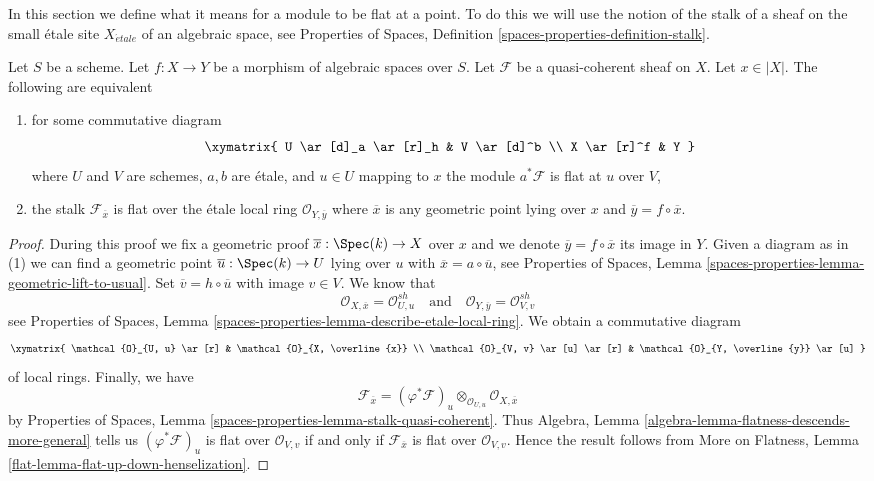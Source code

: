 \noindent
In this section we define what it means for a module to be flat at
a point. To do this we will use the notion of the stalk of a sheaf on
the small \'etale site $X_{\acute{e}tale}$ of an algebraic space, see
Properties of Spaces, Definition \ref{spaces-properties-definition-stalk}.

\begin{lemma}
\label{lemma-flat-at-point}
Let $S$ be a scheme. Let $f : X \to Y$ be a morphism of algebraic
spaces over $S$. Let $\mathcal{F}$ be a quasi-coherent sheaf on $X$.
Let $x \in |X|$. The following are equivalent
\begin{enumerate}
\item for some commutative diagram
$$
\xymatrix{
U \ar[d]_a \ar[r]_h & V \ar[d]^b \\
X \ar[r]^f & Y
}
$$
where $U$ and $V$ are schemes, $a, b$ are \'etale, and
$u \in U$ mapping to $x$ the module $a^*\mathcal{F}$ is flat at $u$ over $V$,
\item the stalk $\mathcal{F}_{\overline{x}}$ is flat over
the \'etale local ring $\mathcal{O}_{Y, \overline{y}}$
where $\overline{x}$ is any geometric point lying over
$x$ and $\overline{y} = f \circ \overline{x}$.
\end{enumerate}
\end{lemma}

\begin{proof}
During this proof we fix a geometric proof
$\overline{x} : \Spec(k) \to X$ over $x$ and
we denote $\overline{y} = f \circ \overline{x}$ its image in $Y$.
Given a diagram as in (1) we can find a geometric point
$\overline{u} : \Spec(k) \to U$ lying over $u$ with
$\overline{x} = a \circ \overline{u}$, see
Properties of Spaces, Lemma
\ref{spaces-properties-lemma-geometric-lift-to-usual}.
Set $\overline{v} = h \circ \overline{u}$ with image $v \in V$.
We know that
$$
\mathcal{O}_{X, \overline{x}} = \mathcal{O}_{U, u}^{sh}
\quad\text{and}\quad
\mathcal{O}_{Y, \overline{y}} = \mathcal{O}_{V, v}^{sh}
$$
see
Properties of Spaces, Lemma
\ref{spaces-properties-lemma-describe-etale-local-ring}.
We obtain a commutative diagram
$$
\xymatrix{
\mathcal{O}_{U, u} \ar[r] &
\mathcal{O}_{X, \overline{x}} \\
\mathcal{O}_{V, v} \ar[u] \ar[r] &
\mathcal{O}_{Y, \overline{y}} \ar[u]
}
$$
of local rings. Finally, we have
$$
\mathcal{F}_{\overline{x}} =
(\varphi^*\mathcal{F})_u \otimes_{\mathcal{O}_{U, u}}
\mathcal{O}_{X, \overline{x}}
$$
by
Properties of Spaces, Lemma \ref{spaces-properties-lemma-stalk-quasi-coherent}.
Thus
Algebra, Lemma \ref{algebra-lemma-flatness-descends-more-general}
tells us $(\varphi^*\mathcal{F})_u$ is flat over $\mathcal{O}_{V, v}$
if and only if $\mathcal{F}_{\overline{x}}$ is flat over $\mathcal{O}_{V, v}$.
Hence the result follows from
More on Flatness, Lemma \ref{flat-lemma-flat-up-down-henselization}.
\end{proof}

